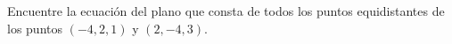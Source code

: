 \item Encuentre la ecuación del plano que consta de todos los puntos equidistantes de los puntos $(-4, 2, 1)$ y $(2, -4, 3)$.
